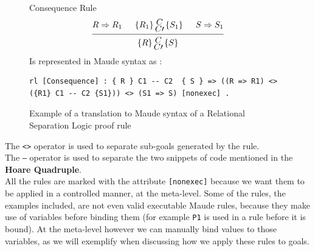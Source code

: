 \documentclass[12pt,a4paper]{article}
\newcommand{\hq}[4]{
	\left\{{#1}\right\}
	\let\scriptstyle\textstyle 
	\substack{{#2} \\ 	\let\scriptstyle\textstyle {#3}} 
	\left\{{#4}\right\}
}
\begin{document}
\begin{figure}[h]
	Consequence Rule
	\[
	\begin{prooftree}
	\Hypo{R \Rightarrow R_1}
	\Hypo{\hq{R_1}{C}{C\prime}{S_1}}
	\Hypo{S \Rightarrow S_1}
	\Infer 3 {\hq{R}{C}{C\prime}{S}}
	\end{prooftree}	
	\]
	Is represented in Maude syntax as : 
	\begin{lstlisting}[caption=Relational Separation Logic Consequence rule]
	rl [Consequence] : { R } C1 -- C2  { S } => ((R => R1) <> ({R1} C1 -- C2 {S1})) <> (S1 => S) [nonexec] .
	\end{lstlisting}
	\caption{Example of a translation to Maude syntax of a Relational Separation Logic proof rule}
	\label{fig:RSLTranslation}
\end{figure}
The \texttt{<>} operator is used to separate sub-goals generated by the rule.
\\

The \texttt{---} operator is used to separate the two snippets of code mentioned in the \textbf{Hoare Quadruple}.
\\

All the rules are marked with the attribute \texttt{[nonexec]} because we want them to be applied in a controlled manner, at the meta-level. Some of the rules, the examples included, are not even valid executable Maude rules, because they make use of variables before binding them (for example \texttt{P1} is used in a rule before it is bound). At the meta-level however we can manually bind values to those variables, as we will exemplify when discussing how we apply these rules to goals.
\end{document}
